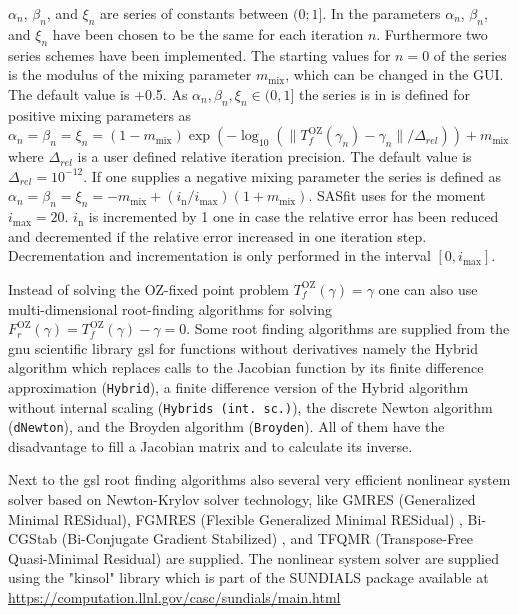 $\alpha_n$, $\beta_n$, and $\xi_n$ are series of constants between $(0;1]$. In \SASfit the parameters $\alpha_n$, $\beta_n$, and $\xi_n$ have been chosen to be the same for each iteration $n$. Furthermore two series schemes have been implemented. The starting values for $n=0$ of the series is the modulus of the mixing parameter $m_\mathrm{mix}$, which can be changed in the GUI. The default value is +0.5. As $\alpha_n,\beta_n,\xi_n \in (0,1]$ the series is in \SASfit is defined for positive mixing parameters as $\alpha_n=\beta_n=\xi_n=(1-m_\mathrm{mix}) \exp\left(-\log_{10}( \|T^\mathrm{OZ}_f(\gamma_{n})-\gamma_{n}\|/\Delta_{rel})\right)+m_\mathrm{mix}$ where $\Delta_{rel}$ is a user defined relative iteration precision. The default value is $\Delta_{rel}=10^{-12}$. If one supplies a negative mixing parameter the series is defined as  $\alpha_n=\beta_n=\xi_n=-m_\mathrm{mix}+(i_\mathrm{n}/i_\mathrm{max}) \left(1+m_\mathrm{mix}\right)$. SASfit uses for the moment $i_\mathrm{max}=20$. $i_\mathrm{n}$ is incremented by 1 one in case the relative error has been reduced and decremented if the relative error increased in one iteration step. Decrementation and incrementation is only performed in the interval $[0,i_\mathrm{max}]$.

Instead of solving the OZ-fixed point problem $T^\mathrm{OZ}_f(\gamma)=\gamma$ one can also use multi-dimensional root-finding algorithms for solving $F^\mathrm{OZ}_r(\gamma)=T^\mathrm{OZ}_f(\gamma)-\gamma=0$. Some root finding algorithms are supplied from the gnu scientific library gsl for functions without derivatives namely the Hybrid algorithm which replaces calls to the Jacobian function by its finite difference approximation (\texttt{Hybrid}), a finite difference version of the Hybrid algorithm without internal scaling (\texttt{Hybrids (int. sc.)}), the discrete Newton algorithm (\texttt{dNewton}), and the Broyden algorithm (\texttt{Broyden}). All of them have the disadvantage to fill a Jacobian matrix and to calculate its inverse.

Next to the gsl root finding algorithms also several very efficient nonlinear system solver based on Newton-Krylov solver technology, like GMRES (Generalized Minimal RESidual)\cite{Saad1986,Kelley2003}, FGMRES (Flexible Generalized Minimal RESidual) \cite{Saad1993}, Bi-CGStab (Bi-Conjugate Gradient Stabilized) \cite{Vorst1992,Kelley2003}, and TFQMR (Transpose-Free Quasi-Minimal Residual) \cite{Freund1993,Kelley2003} are supplied. The nonlinear system solver are supplied using the "kinsol" library which is part of the SUNDIALS package \cite{Hindmarsh2005} available at \url{https://computation.llnl.gov/casc/sundials/main.html}

